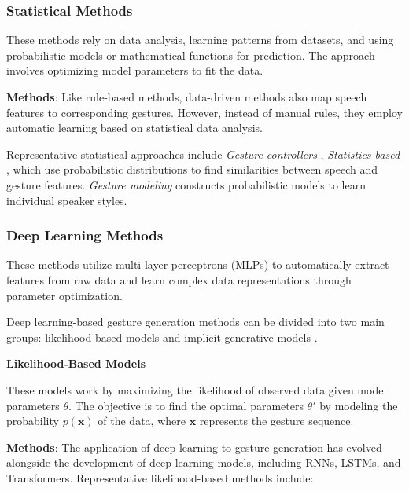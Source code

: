 \subsubsection{Statistical Methods}

These methods rely on data analysis, learning patterns from datasets, and using probabilistic models or mathematical functions for prediction. The approach involves optimizing model parameters to fit the data.


\textbf{Methods}: Like rule-based methods, data-driven methods also map speech features to corresponding gestures. However, instead of manual rules, they employ automatic learning based on statistical data analysis.

Representative statistical approaches include \textit{Gesture controllers} \cite{levine2010gesture}, \textit{Statistics-based} \cite{yang2020statistics}, which use probabilistic distributions to find similarities between speech and gesture features. \textit{Gesture modeling} \cite{neff2008gesture} constructs probabilistic models to learn individual speaker styles.

\subsubsection{Deep Learning Methods}

These methods utilize multi-layer perceptrons (MLPs) to automatically extract features from raw data and learn complex data representations through parameter optimization.


Deep learning-based gesture generation methods can be divided into two main groups: likelihood-based models and implicit generative models \cite{song2021score}.


\textbf{Likelihood-Based Models}

These models work by maximizing the likelihood of observed data given model parameters $\theta$. The objective is to find the optimal parameters $\theta'$ by modeling the probability $p(\mathbf{x})$ of the data, where $\mathbf{x}$ represents the gesture sequence.


\textbf{Methods}: The application of deep learning to gesture generation has evolved alongside the development of deep learning models, including RNNs, LSTMs, and Transformers. Representative likelihood-based methods include:

